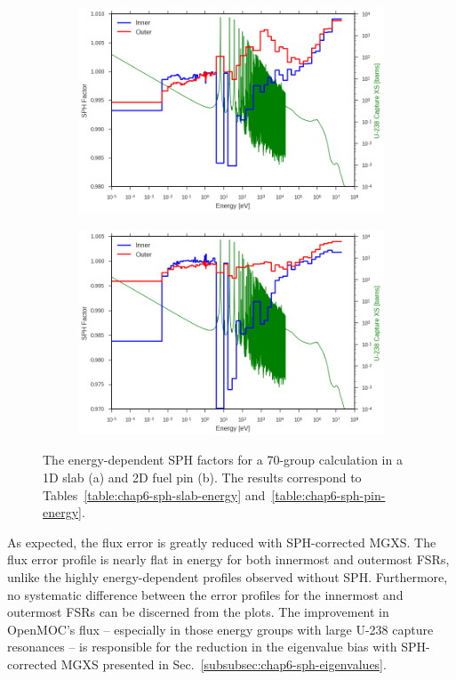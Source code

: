 \begin{figure}[h!]
\begin{subfigure}{.9\textwidth}
  \centering
  \includegraphics[width=\linewidth]{figures/sph/slab/sph-inner-outer}
  \caption{}
\end{subfigure}
\begin{subfigure}{.9\textwidth}
  \centering
  \includegraphics[width=\linewidth]{figures/sph/pin-cell/sph-inner-outer}
  \caption{}
\end{subfigure}
\caption[SPH factors by energy group]{The energy-dependent \ac{SPH} factors for a 70-group calculation in a 1D slab (a) and 2D fuel pin (b). The results correspond to Tables~\ref{table:chap6-sph-slab-energy} and~\ref{table:chap6-sph-pin-energy}.}
\label{fig:chap6-sph-energy}
\end{figure}

As expected, the flux error is greatly reduced with \ac{SPH}-corrected \ac{MGXS}. The flux error profile is nearly flat in energy for both innermost and outermost \ac{FSR}s, unlike the highly energy-dependent profiles observed without \ac{SPH}. Furthermore, no systematic difference between the error profiles for the innermost and outermost \ac{FSR}s can be discerned from the plots. The improvement in OpenMOC's flux -- especially in those energy groups with large U-238 capture resonances -- is responsible for the reduction in the eigenvalue bias with \ac{SPH}-corrected \ac{MGXS} presented in Sec.~\ref{subsubsec:chap6-sph-eigenvalues}.

